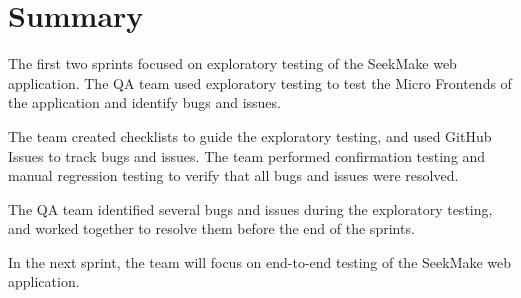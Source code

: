 \section{Summary}

The first two sprints focused on exploratory testing of the SeekMake web application. The QA team used exploratory testing to test the Micro Frontends of the application and identify bugs and issues.

The team created checklists to guide the exploratory testing, and used GitHub Issues to track bugs and issues. The team performed confirmation testing and manual regression testing to verify that all bugs and issues were resolved.

The QA team identified several bugs and issues during the exploratory testing, and worked together to resolve them before the end of the sprints.

In the next sprint, the team will focus on end-to-end testing of the SeekMake web application.